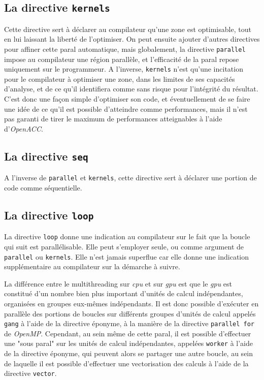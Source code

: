 \documentclass{article}
\begin{document}
\subsection{La directive \texttt{kernels}}

Cette directive sert à déclarer au compilateur qu'une zone est optimisable, tout en lui laissant la liberté de l'optimiser. On peut ensuite ajouter d'autres directives pour affiner cette \gls{paral} automatique, mais globalement, la directive \texttt{parallel} impose au compilateur une région parallèle, et l'efficacité de la \gls{paral} repose uniquement sur le programmeur. A l'inverse, \texttt{kernels} n'est qu'une incitation pour le compilateur à optimiser une zone, dans les limites de ses capacités d'analyse, et de ce qu'il identifiera comme sans risque pour l'intégrité du résultat. C'est donc une façon simple d'optimiser son code, et éventuellement de se faire une idée de ce qu'il est possible d'atteindre comme performances, mais il n'est pas garanti de tirer le maximum de performances atteignables à l'aide d'\textit{OpenACC}.

\subsection{La directive \texttt{seq}}

A l'inverse de \texttt{parallel} et \texttt{kernels}, cette directive sert à déclarer une portion de code comme séquentielle.

\subsection{La directive \texttt{loop}}

La directive \texttt{loop} donne une indication au compilateur sur le fait que la boucle qui suit est parallélisable. Elle peut s'employer seule, ou comme argument de \texttt{parallel} ou \texttt{kernels}. Elle n'est jamais superflue car elle donne une indication supplémentaire au compilateur sur la démarche à suivre.

La différence entre le multithreading sur \textit{\gls{cpu}} et sur \textit{\gls{gpu}} est que le \textit{\gls{gpu}} est constitué d'un nombre bien plus important d'unités de calcul indépendantes, organisées en groupes eux-mêmes indépendants. Il est donc possible d'exécuter en parallèle des portions de boucles sur différents groupes d'unités de calcul appelés \verb|gang| à l'aide de la directive éponyme, à la manière de la directive \verb|parallel for| de \textit{OpenMP}. Cependant, au sein même de cette \gls{paral}, il est possible d'effectuer une "sous \gls{paral}" sur les unités de calcul indépendantes, appelées \verb|worker| à l'aide de la directive éponyme, qui peuvent alors se partager une autre boucle, au sein de laquelle il est possible d'effectuer une vectorisation des calculs à l'aide de la directive \verb|vector|.
\end{document}
